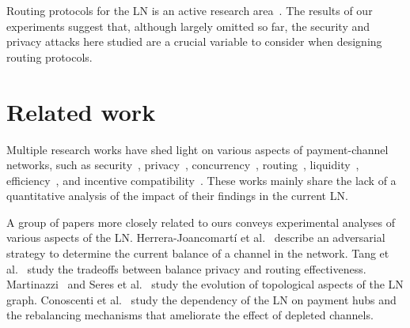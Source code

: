 Routing protocols for the LN is an active research area~\cite{Roos2018, Sivaraman2018, Malavolta2017a, Prihodko2016, Grunspan2018, Bagaria2019, Osuntokun2018, Pickhardt2019, ZmnSCPxj2019, ZmnSCPxj2019a, ZmnSCPxj2019b}.
The results of our experiments suggest that, although largely omitted so far, 
the security and privacy attacks here studied are a crucial variable to consider when designing routing protocols. 


\section{Related work}


Multiple research works have shed light on various aspects of payment-channel networks, such as security~\cite{Malavolta2019, Kiayias2019}, privacy~\cite{Malavolta2017, HerreraJoancomarti2019}, concurrency~\cite{Malavolta2017}, routing~\cite{Malavolta2017a, Roos2018, Sivaraman2018, Prihodko2016}, liquidity~\cite{Dandekar2011,MorenoSanchez2018}, efficiency~\cite{Decker2018}, and incentive compatibility~\cite{Engelmann2017}.
These works mainly share the lack of a quantitative analysis of the impact of their findings in the current LN.

A group of papers more closely related to ours conveys experimental analyses of various aspects of the LN.
Herrera-Joancomart\'{i} et al.~\cite{HerreraJoancomarti2019} describe an adversarial 
strategy to determine the current balance of a channel in the network.
Tang et al.~\cite{Tang2019} study 
the tradeoffs between balance privacy and routing effectiveness. 
Martinazzi~\cite{Martinazzi2019} and Seres et al.~\cite{Seres2019} study the evolution of topological aspects of the LN graph.
Conoscenti et al.~\cite{Conoscenti2019} study the dependency of the LN on payment hubs 
and the rebalancing mechanisms that ameliorate the effect of depleted channels.



